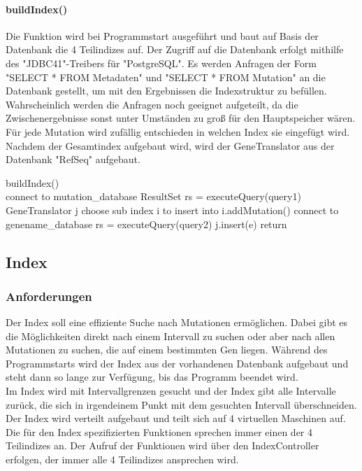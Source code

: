 \paragraph{buildIndex()}
Die Funktion wird bei Programmstart ausgeführt und baut auf Basis der Datenbank die 4 Teilindizes auf. Der Zugriff auf die Datenbank erfolgt mithilfe des "JDBC41"-Treibers für "PostgreSQL". Es werden Anfragen der Form "SELECT * FROM Metadaten" und "SELECT * FROM Mutation" an die Datenbank gestellt, um mit den Ergebnissen die Indexstruktur zu befüllen. Wahrscheinlich werden die Anfragen noch geeignet aufgeteilt, da die Zwischenergebnisse sonst unter Umständen zu groß für den Hauptspeicher wären.\\
Für jede Mutation wird zufällig entschieden in welchen Index sie eingefügt wird.\\
Nachdem der Gesamtindex aufgebaut wird, wird der GeneTranslator aus der Datenbank "RefSeq" aufgebaut.
\begin{algorithm}
buildIndex()\\
\KwData{--}
connect to mutation\_database\;
ResultSet rs = executeQuery(query1)\;
GeneTranslator j\;
{choose sub index i to insert into\;
i.addMutation()\;}
connect to genename\_database\;
rs = executeQuery(query2)\;
{j.insert(e)\;}
return\;
\end{algorithm}
\newpage

\subsection{Index}
\subsubsection{Anforderungen}
Der Index soll eine effiziente Suche nach Mutationen ermöglichen. Dabei gibt es die Möglichkeiten direkt nach einem Intervall zu suchen oder aber nach allen Mutationen zu suchen, die auf einem bestimmten Gen liegen. Während des Programmstarts wird der Index aus der vorhandenen Datenbank aufgebaut und steht dann so lange zur Verfügung, bis das Programm beendet wird.\\
Im Index wird mit Intervallgrenzen gesucht und der Index gibt alle Intervalle zurück, die sich in irgendeinem Punkt mit dem gesuchten Intervall überschneiden.\\
Der Index wird verteilt aufgebaut und teilt sich auf 4 virtuellen Maschinen auf. Die für den Index spezifizierten Funktionen sprechen immer einen der 4 Teilindizes an. Der Aufruf der Funktionen wird über den IndexController erfolgen, der immer alle 4 Teilindizes ansprechen wird.

